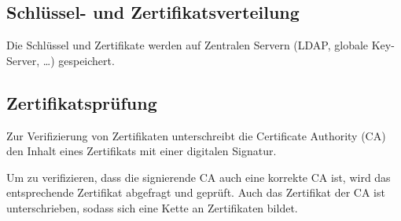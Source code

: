 \documentclass[a4paper, 11pt, accentcolor = tud3b]{tudreport}
\begin{document}
            \subsection{Schlüssel- und Zertifikatsverteilung}
                Die Schlüssel und Zertifikate werden auf Zentralen Servern (LDAP, globale Key-Server, \dots) gespeichert.

            \subsection{Zertifikatsprüfung}
                Zur Verifizierung von Zertifikaten unterschreibt die Certificate Authority (CA) den Inhalt eines Zertifikats mit einer digitalen Signatur.
                
                Um zu verifizieren, dass die signierende CA auch eine korrekte CA ist, wird das entsprechende Zertifikat abgefragt und geprüft. Auch das Zertifikat der CA ist unterschrieben, sodass sich eine Kette an Zertifikaten bildet.
\end{document}
